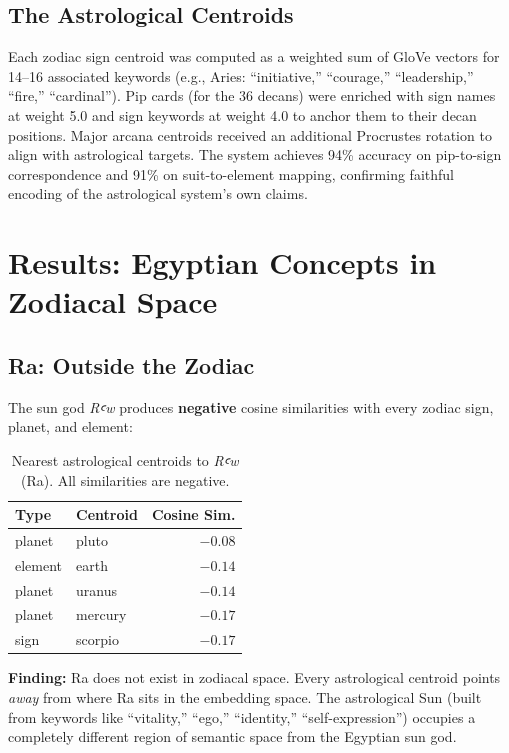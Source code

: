 \documentclass[11pt, a4paper]{article}
\begin{document}
\subsection{The Astrological Centroids}

Each zodiac sign centroid was computed as a weighted sum of GloVe vectors for 14--16 associated keywords (e.g., Aries: ``initiative,'' ``courage,'' ``leadership,'' ``fire,'' ``cardinal''). Pip cards (for the 36 decans) were enriched with sign names at weight 5.0 and sign keywords at weight 4.0 to anchor them to their decan positions. Major arcana centroids received an additional Procrustes rotation to align with astrological targets. The system achieves 94\% accuracy on pip-to-sign correspondence and 91\% on suit-to-element mapping, confirming faithful encoding of the astrological system's own claims.

\section{Results: Egyptian Concepts in Zodiacal Space}
\label{sec:results}

\subsection{Ra: Outside the Zodiac}

The sun god \textit{Rꜥw} produces \textbf{negative} cosine similarities with every zodiac sign, planet, and element:

\begin{table}[H]
\centering
\begin{tabular}{llr}
\toprule
\textbf{Type} & \textbf{Centroid} & \textbf{Cosine Sim.} \\
\midrule
planet & pluto & $-0.08$ \\
element & earth & $-0.14$ \\
planet & uranus & $-0.14$ \\
planet & mercury & $-0.17$ \\
sign & scorpio & $-0.17$ \\
\bottomrule
\end{tabular}
\caption{Nearest astrological centroids to \textit{Rꜥw} (Ra). All similarities are negative.}
\end{table}

{\color{insight}\textbf{Finding:}} Ra does not exist in zodiacal space. Every astrological centroid points \textit{away} from where Ra sits in the embedding space. The astrological Sun (built from keywords like ``vitality,'' ``ego,'' ``identity,'' ``self-expression'') occupies a completely different region of semantic space from the Egyptian sun god.
\end{document}
